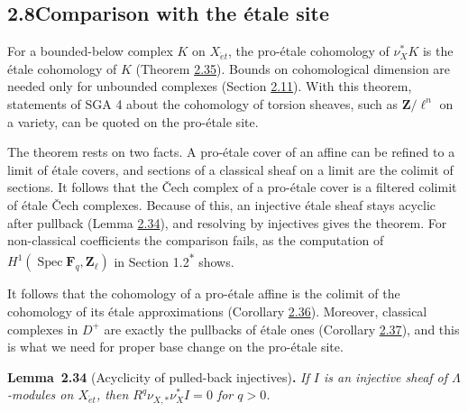 \documentclass[11pt]{article}
\newenvironment{bpstatement}[2]{\par\addvspace{0.6\baselineskip}\noindent\textbf{#1}#2\textbf{.}\enspace\ignorespaces}
  {\par\addvspace{0.4\baselineskip}}
\newenvironment{bpstatementit}[2]{\begin{bpstatement}{#1}{#2}\itshape\ignorespaces}{\end{bpstatement}}
\newcommand{\bpout}[1]{#1\textsuperscript{\hyperlink{bp-outside}{\ensuremath{\ast}}}}
\begin{document}
\subsection*{\texorpdfstring{2.8\quad Comparison with the étale site}{2.8 Comparison with the étale site}}
\label{bp98}%
\label{bp99}%
For a bounded-below complex \(K\) on \(X_{\acute{e}t}\), the pro-étale cohomology of \(\nu_X^*K\) is the étale cohomology of \(K\) (Theorem \hyperref[bp103]{2.35}). Bounds on cohomological dimension are needed only for unbounded complexes (Section \hyperref[bp135]{2.11}). With this theorem, statements of SGA 4 about the cohomology of torsion sheaves, such as \(\mathbf Z/\ell^n\) on a variety, can be quoted on the pro-étale site.

The theorem rests on two facts. A pro-étale cover of an affine can be refined to a limit of étale covers, and sections of a classical sheaf on a limit are the colimit of sections. It follows that the Čech complex of a pro-étale cover is a filtered colimit of étale Čech complexes. Because of this, an injective étale sheaf stays acyclic after pullback (Lemma \hyperref[bp100]{2.34}), and resolving by injectives gives the theorem. For non-classical coefficients the comparison fails, as the computation of \(H^1(\operatorname{Spec}\mathbf F_q,\mathbf Z_\ell)\) in Section \bpout{1.2} shows.

It follows that the cohomology of a pro-étale affine is the colimit of the cohomology of its étale approximations (Corollary \hyperref[bp106]{2.36}). Moreover, classical complexes in \(D^+\) are exactly the pullbacks of étale ones (Corollary \hyperref[bp109]{2.37}), and this is what we need for proper base change on the pro-étale site.

\label{bp100}%
\begin{bpstatementit}{Lemma~2.34}{ (Acyclicity of pulled-back injectives)}
If \(I\) is an injective sheaf of \(\Lambda\)-modules on \(X_{\acute{e}t}\), then \(R^q\nu_{X,*}\nu_X^*I=0\) for \(q>0\).
\end{bpstatementit}
\end{document}
